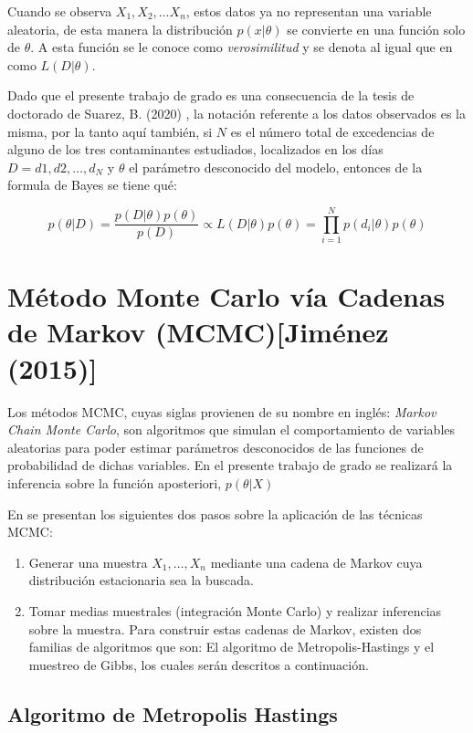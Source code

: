 Cuando se observa $X_1, X_2, \dots X_n$, estos datos ya no representan una variable aleatoria, de esta manera la distribución $p(x|\theta)$ se convierte en una función solo de $\theta$. A esta función se le conoce como \textit{verosimilitud} y se denota al igual que en \cite{tesisbiviana} como $L(D|\theta)$.

Dado que el presente trabajo de grado es una consecuencia de la tesis de doctorado de Suarez, B. (2020) \cite{tesisbiviana}, la notación referente a los datos observados es la misma, por la tanto aquí también, si $N$ es el número total de excedencias de alguno de los tres contaminantes estudiados, localizados en los días $D={d1, d2, \dots , d_N}$ y $\theta$ el parámetro desconocido del modelo, entonces de la formula de Bayes se tiene qué: 

\begin{equation}
\label{verosimilitud}
p(\theta|D)=\frac{p(D|\theta)p(\theta)}{p(D)}\propto L(D|\theta)p(\theta)=\prod_{i=1}^N p(d_i|\theta)p(\theta)
\end{equation} 


\section{Método Monte Carlo vía Cadenas de Markov (MCMC)[Jiménez (2015)]} 

Los métodos MCMC, cuyas siglas provienen de su nombre en inglés: \textit{Markov Chain Monte Carlo}, son algoritmos que simulan el comportamiento de variables aleatorias para poder estimar parámetros desconocidos de las funciones de probabilidad de dichas variables. En el presente trabajo de grado se realizará la inferencia sobre la función aposteriori, $p(\theta|X)$

En \cite{MCMC} se presentan los siguientes dos pasos sobre la aplicación de las técnicas MCMC: 

\begin{enumerate}
\item Generar una muestra $X_1, \dots, X_n$ mediante una cadena de Markov cuya distribución estacionaria sea la buscada. 
\item Tomar medias muestrales (integración Monte Carlo) y realizar inferencias sobre la muestra. Para construir estas cadenas de Markov, existen dos familias de algoritmos que son: El algoritmo de Metropolis-Hastings y el muestreo de Gibbs, los cuales serán descritos a continuación. 
\end{enumerate}
\subsection{Algoritmo de Metropolis Hastings}

